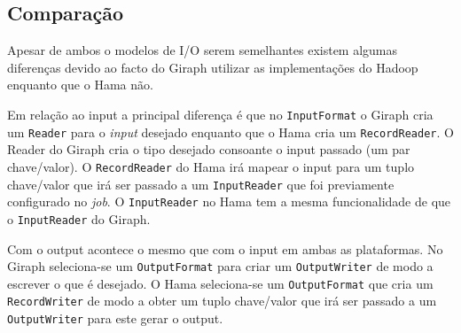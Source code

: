 
\subsection*{Comparação}

Apesar de ambos o modelos de I/O serem semelhantes existem algumas diferenças devido ao facto do Giraph utilizar as implementações 
do Hadoop enquanto que o Hama não. 

Em relação ao input a principal diferença é que no \texttt{InputFormat} o Giraph cria um \texttt{Reader} para o \textit{input} desejado enquanto que 
o Hama cria um \texttt{RecordReader}. O Reader do Giraph cria o tipo desejado consoante o input passado (um par chave/valor). O \texttt{RecordReader}
do Hama irá mapear o input para um tuplo chave/valor que irá ser passado a um \texttt{InputReader} que foi previamente configurado no \textit{job}. O \texttt{InputReader}
no Hama tem a mesma funcionalidade de que o \texttt{InputReader} do Giraph.

Com o output acontece o mesmo que com o input em ambas as plataformas. No Giraph seleciona-se um \texttt{OutputFormat} para criar um \texttt{OutputWriter} de modo
a escrever o que é desejado. O Hama seleciona-se um \texttt{OutputFormat} que cria um \texttt{RecordWriter} de modo a obter um tuplo chave/valor que irá ser
passado a um \texttt{OutputWriter} para este gerar o output.